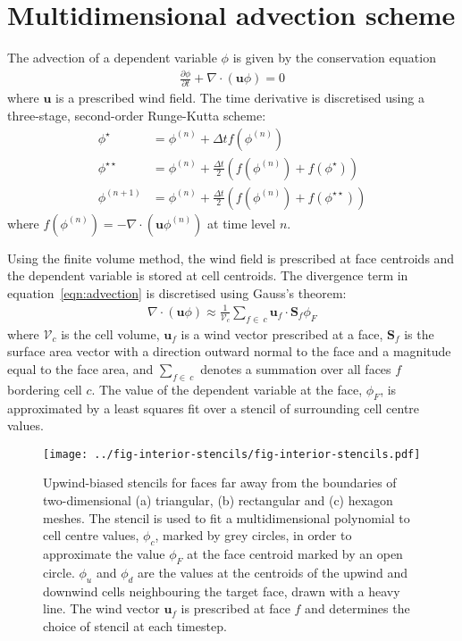 \section{Multidimensional advection scheme}

The advection of a dependent variable $\phi$ is given by the conservation equation
\begin{align}
	\frac{\partial \phi}{\partial t} + \nabla \cdot \left( \mathbf{u} \phi \right) = 0 \label{eqn:advection}
\end{align}
where $\mathbf{u}$ is a prescribed wind field.  The time derivative is discretised using a three-stage, second-order Runge-Kutta scheme:
\begin{subequations}
\begin{align}
	\phi^\star &= \phi^{(n)} + \Delta t f(\phi^{(n)}) \\
	\phi^{\star\star} &= \phi^{(n)} + \frac{\Delta t}{2} \left( f(\phi^{(n)}) + f(\phi^\star) \right) \\
	\phi^{(n+1)} &= \phi^{(n)} + \frac{\Delta t}{2} \left( f(\phi^{(n)}) + f(\phi^{\star\star}) \right)
\end{align}
\end{subequations}
where \(f(\phi^{(n)}) = - \nabla \cdot (\mathbf{u} \phi^{(n)})\) at time level \(n\).

Using the finite volume method, the wind field is prescribed at face centroids and the dependent variable is stored at cell centroids.  The divergence term in equation~\eqref{eqn:advection} is discretised using Gauss's theorem:
\begin{align}
	\nabla \cdot \left( \mathbf{u} \phi \right) \approx \frac{1}{\mathcal{V}_c} \sum_{f \in\:c} \mathbf{u}_f \cdot \mathbf{S}_f \phi_F
\end{align}
where $\mathcal{V}_c$ is the cell volume, $\mathbf{u}_f$ is a wind vector prescribed at a face, ${\mathbf{S}_f}$ is the surface area vector with a direction outward normal to the face and a magnitude equal to the face area, and $\sum_{f \in\:c}$ denotes a summation over all faces $f$ bordering cell $c$.  The value of the dependent variable at the face, $\phi_F$, is approximated by a least squares fit over a stencil of surrounding cell centre values.

\begin{figure}
	\centering
	\texttt{[image: ../fig-interior-stencils/fig-interior-stencils.pdf]}
	\caption{Upwind-biased stencils for faces far away from the boundaries of two-dimensional (a) triangular, (b) rectangular and (c) hexagon meshes.  The stencil is used to fit a multidimensional polynomial to cell centre values, $\phi_c$, marked by grey circles, in order to approximate the value $\phi_F$ at the face centroid marked by an open circle.  $\phi_u$ and $\phi_d$ are the values at the centroids of the upwind and downwind cells neighbouring the target face, drawn with a heavy line.  The wind vector $\mathbf{u}_f$ is prescribed at face $f$ and determines the choice of stencil at each timestep.}
	\label{fig:interiorStencils}
\end{figure}

